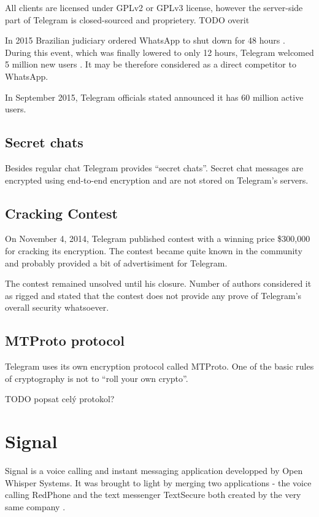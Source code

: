 \documentclass[thesis=M,english]{FITthesis}[2012/10/20]
\begin{document}
All clients are licensed under GPLv2 or GPLv3 license, however the server-side part of Telegram is closed-sourced and proprietery. TODO overit

In 2015 Brazilian judiciary ordered WhatsApp to shut down for 48 hours \cite{whatsappbrazil}. During this event, which was finally lowered to only 12 hours, Telegram welcomed 5 million new users \cite{whatsappbrazil}. It may be therefore considered as a direct competitor to WhatsApp.

In September 2015, Telegram officials stated announced it has 60 million active users.\cite{x}


\subsection{Secret chats}

Besides regular chat Telegram provides ``secret chats''. Secret chat messages are encrypted using end-to-end encryption and are not stored on Telegram's servers\cite{telegramfaq}.

\subsection{Cracking Contest}

On November 4, 2014, Telegram published contest with a winning price \$300,000 for cracking its encryption. The contest became quite known in the community and probably provided a bit of advertisiment for Telegram.

The contest remained unsolved until his closure. Number of authors considered it as rigged and stated that the contest does not provide any prove of Telegram's overall security whatsoever.\cite{telegramcontestfail}\cite{telegramcontestfail2}

\subsection{MTProto protocol}

Telegram uses its own encryption protocol called MTProto. One of the basic rules of cryptography is not to ``roll your own crypto''.

TODO popsat celý protokol?


\section{Signal}

Signal is a voice calling and instant messaging application developped by Open Whisper Systems. It was brought to light by merging two applications - the voice calling RedPhone and the text messenger TextSecure both created by the very same company \cite{signalmerge}.
\end{document}

